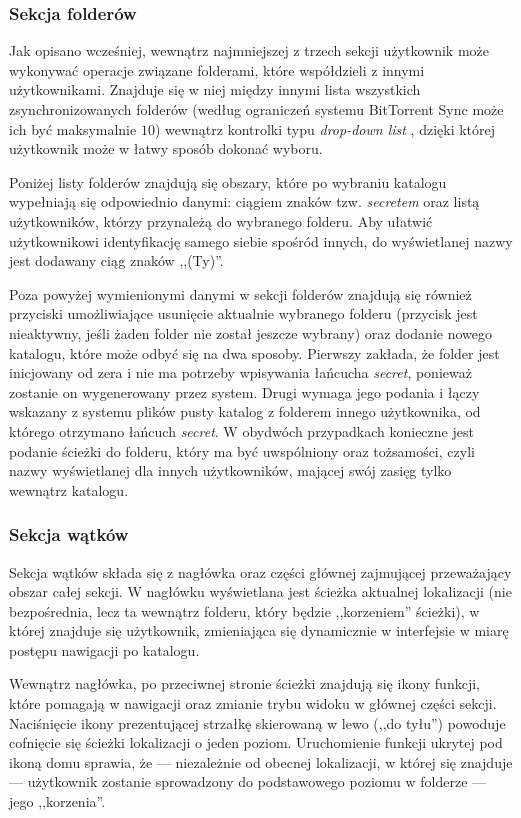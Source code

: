 \documentclass[polish,a4paper,twoside]{ppfcmthesis}
\begin{document}
\subsubsection*{Sekcja folderów}

Jak opisano wcześniej, wewnątrz najmniejszej z trzech sekcji użytkownik może wykonywać operacje związane folderami, które współdzieli z innymi użytkownikami. Znajduje się w niej między innymi lista wszystkich zsynchronizowanych folderów (według ograniczeń systemu BitTorrent Sync może ich być maksymalnie $10$) wewnątrz kontrolki typu \emph{drop-down list} \cite{dropdownlist}, dzięki której użytkownik może w łatwy sposób dokonać wyboru.

Poniżej listy folderów znajdują się obszary, które po wybraniu katalogu wypełniają się odpowiednio danymi: ciągiem znaków tzw. \emph{secretem} oraz listą użytkowników, którzy przynależą do wybranego folderu. Aby ułatwić użytkownikowi identyfikację samego siebie spośród innych, do wyświetlanej nazwy jest dodawany ciąg znaków ,,(Ty)''.

Poza powyżej wymienionymi danymi w sekcji folderów znajdują się również przyciski umożliwiające usunięcie aktualnie wybranego folderu (przycisk jest nieaktywny, jeśli żaden folder nie został jeszcze wybrany) oraz dodanie nowego katalogu, które może odbyć się na dwa sposoby. Pierwszy zakłada, że folder jest inicjowany od zera i nie ma potrzeby wpisywania łańcucha \emph{secret}, ponieważ zostanie on wygenerowany przez system. Drugi wymaga jego podania i łączy wskazany z systemu plików pusty katalog z folderem innego użytkownika, od którego otrzymano łańcuch \emph{secret}. W obydwóch przypadkach konieczne jest podanie ścieżki do folderu, który ma być uwspólniony oraz tożsamości, czyli nazwy wyświetlanej dla innych użytkowników, mającej swój zasięg tylko wewnątrz katalogu.

\subsubsection*{Sekcja wątków}

Sekcja wątków składa się z nagłówka oraz części głównej zajmującej przeważający obszar całej sekcji. W nagłówku wyświetlana jest ścieżka aktualnej lokalizacji (nie bezpośrednia, lecz ta wewnątrz folderu, który będzie ,,korzeniem'' ścieżki), w której znajduje się użytkownik, zmieniająca się dynamicznie w interfejsie w miarę postępu nawigacji po katalogu.

Wewnątrz nagłówka, po przeciwnej stronie ścieżki znajdują się ikony funkcji, które pomagają w nawigacji oraz zmianie trybu widoku w głównej części sekcji. Naciśnięcie ikony prezentującej strzałkę skierowaną w lewo (,,do tyłu'') powoduje cofnięcie się ścieżki lokalizacji o jeden poziom. Uruchomienie funkcji ukrytej pod ikoną domu sprawia, że --- niezależnie od obecnej lokalizacji, w której się znajduje --- użytkownik zostanie sprowadzony do podstawowego poziomu w folderze --- jego ,,korzenia''.
\end{document}
